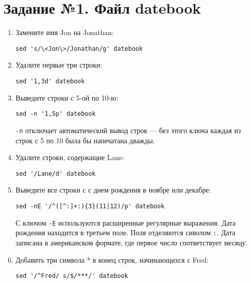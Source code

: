 \documentclass[listings]{labreport}
\begin{document}
\maketitlepage

\section*{Задание №1. Файл datebook}

\begin{enumerate}
\item Замените имя Jon на Jonathan:
\begin{verbatim}
sed 's/\<Jon\>/Jonathan/g' datebook
\end{verbatim}

\item Удалите первые три строки:
\begin{verbatim}
sed '1,3d' datebook
\end{verbatim}

\item Выведите строки с 5-ой по 10-ю:
\begin{verbatim}
sed -n '1,5p' datebook
\end{verbatim}

\begin{small}
  \verb|-n| отключает автоматический вывод строк — без этого ключа каждая из строк с 5 по 10 была бы напечатана дважды.
\end{small}

\item Удалите строки, содержащие Lane:
\begin{verbatim}
sed '/Lane/d' datebook
\end{verbatim}

\item Выведите все строки с с днем рождения в ноябре или декабре:
\begin{verbatim}
sed -nE '/^([^:]+:){3}(11|12)/p' datebook
\end{verbatim}

\begin{small}
  С ключом \verb|-E| используются расширенные регулярные выражения.
  Дата рождения находится в третьем поле. Поля отделяются сиволом \texttt{:}.
  Дата записана в американском формате, где первое число соответствует месяцу.
\end{small}

\item Добавить три символа * в конец строк, начинающихся с Fred:
\begin{verbatim}
sed '/^Fred/ s/$/***/' datebook
\end{verbatim}


\end{enumerate}
\end{document}
